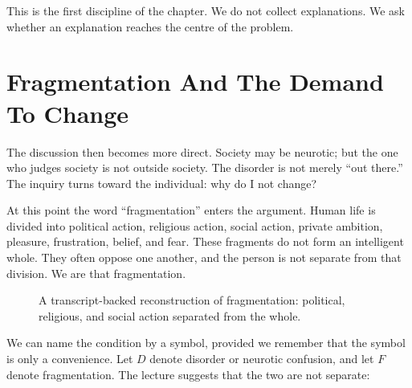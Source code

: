 This is the first discipline of the chapter. We do not collect explanations. We ask whether an explanation reaches the centre of the problem.

\section{Fragmentation And The Demand To Change}

The discussion then becomes more direct. Society may be neurotic; but the one who judges society is not outside society. The disorder is not merely ``out there.'' The inquiry turns toward the individual: why do I not change?

At this point the word ``fragmentation'' enters the argument. Human life is divided into political action, religious action, social action, private ambition, pleasure, frustration, belief, and fear. These fragments do not form an intelligent whole. They often oppose one another, and the person is not separate from that division. We are that fragmentation.

\begin{figure}
\centering
{}
\caption{A transcript-backed reconstruction of fragmentation: political, religious, and social action separated from the whole.}
\end{figure}

We can name the condition by a symbol, provided we remember that the symbol is only a convenience. Let \(D\) denote disorder or neurotic confusion, and let \(F\) denote fragmentation. The lecture suggests that the two are not separate:


